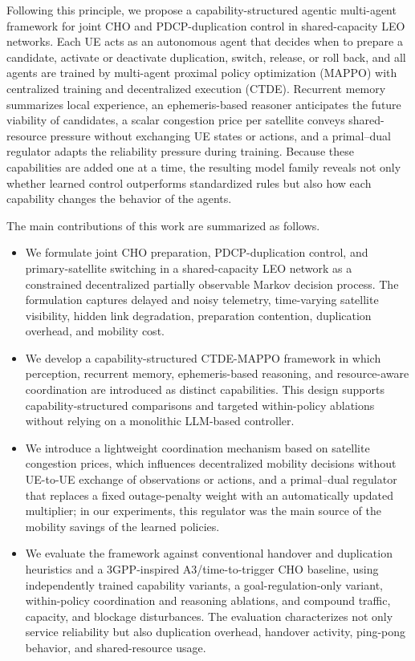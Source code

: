 \documentclass[journal]{IEEEtran}
\begin{document}
Following this principle, we propose a capability-structured agentic
multi-agent framework for joint CHO and PDCP-duplication control in
shared-capacity LEO networks. Each UE acts as an autonomous agent that
decides when to prepare a candidate, activate or deactivate duplication,
switch, release, or roll back, and all agents are trained by multi-agent
proximal policy optimization (MAPPO) with centralized training and
decentralized execution (CTDE). Recurrent memory summarizes local experience,
an ephemeris-based reasoner anticipates the future viability of candidates, a
scalar congestion price per satellite conveys shared-resource pressure
without exchanging UE states or actions, and a primal--dual regulator adapts
the reliability pressure during training. Because these capabilities are
added one at a time, the resulting model family reveals not only whether
learned control outperforms standardized rules but also how each capability
changes the behavior of the agents.

The main contributions of this work are summarized as follows.

\begin{itemize}
    \item We formulate joint CHO preparation, PDCP-duplication control, and
    primary-satellite switching in a shared-capacity LEO network as a
    constrained decentralized partially observable Markov decision process.
    The formulation captures delayed and noisy telemetry, time-varying
    satellite visibility, hidden link degradation, preparation contention,
    duplication overhead, and mobility cost.

    \item We develop a capability-structured CTDE-MAPPO framework in which
    perception, recurrent memory, ephemeris-based reasoning, and
    resource-aware coordination are introduced as distinct capabilities.
    This design supports capability-structured comparisons and targeted
    within-policy ablations without relying on a monolithic LLM-based
    controller.

    \item We introduce a lightweight coordination mechanism based on
    satellite congestion prices, which influences decentralized mobility
    decisions without UE-to-UE exchange of observations or actions, and a
    primal--dual regulator that replaces a fixed outage-penalty weight with
    an automatically updated multiplier; in our experiments, this regulator
    was the main source of the mobility savings of the learned policies.

    \item We evaluate the framework against conventional handover and
    duplication heuristics and a 3GPP-inspired A3/time-to-trigger CHO
    baseline, using independently trained capability variants, a
    goal-regulation-only variant, within-policy coordination and reasoning
    ablations, and compound traffic, capacity, and blockage disturbances. The evaluation characterizes not only service reliability
    but also duplication overhead, handover activity, ping-pong behavior,
    and shared-resource usage.
\end{itemize}
\end{document}
